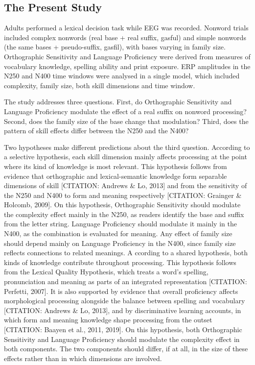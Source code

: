 \documentclass[utf8]{FrontiersinHarvard} %
\begin{document}
	\subsection{The Present Study}
	
	Adults performed a lexical decision task while EEG was recorded. Nonword trials included complex nonwords (real base + real suffix, gasful) and simple nonwords (the same bases + pseudo-suffix, gasfil), with bases varying in family size. Orthographic Sensitivity and Language Proficiency were derived from measures of vocabulary knowledge, spelling ability and print exposure. ERP amplitudes in the N250 and N400 time windows were analysed in a single model, which included complexity, family size, both skill dimensions and time window.
	
	The study addresses three questions. First, do Orthographic Sensitivity and Language Proficiency modulate the effect of a real suffix on nonword processing? Second, does the family size of the base change that modulation? Third, does the pattern of skill effects differ between the N250 and the N400?

	Two hypotheses make different predictions about the third question. According to a selective hypothesis, each skill dimension mainly affects processing at the point where its kind of knowledge is most relevant. This hypothesis follows from evidence that orthographic and lexical-semantic knowledge form separable dimensions of skill [CITATION: Andrews \& Lo, 2013] and from the sensitivity of the N250 and N400 to form and meaning respectively [CITATION: Grainger \& Holcomb, 2009]. On this hypothesis, Orthographic Sensitivity should modulate the complexity effect mainly in the N250, as readers identify the base and suffix from the letter string. Language Proficiency should modulate it mainly in the N400, as the combination is evaluated for meaning. Any effect of family size should depend mainly on Language Proficiency in the N400, since family size reflects connections to related meanings.
	A
	ccording to a shared hypothesis, both kinds of knowledge contribute throughout processing. This hypothesis follows from the Lexical Quality Hypothesis, which treats a word’s spelling, pronunciation and meaning as parts of an integrated representation [CITATION: Perfetti, 2007]. It is also supported by evidence that overall proficiency affects morphological processing alongside the balance between spelling and vocabulary [CITATION: Andrews \& Lo, 2013], and by discriminative learning accounts, in which form and meaning knowledge shape processing from the outset [CITATION: Baayen et al., 2011, 2019]. On this hypothesis, both Orthographic Sensitivity and Language Proficiency should modulate the complexity effect in both components. The two components should differ, if at all, in the size of these effects rather than in which dimensions are involved.
	
\end{document}
